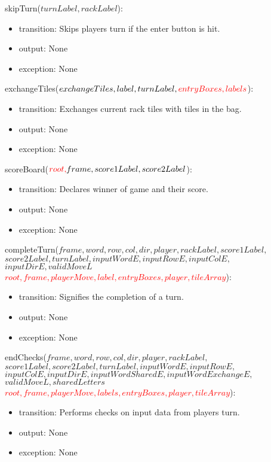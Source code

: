 \documentclass[12pt]{article}
\begin{document}
\noindent skipTurn($turnLabel, rackLabel$):
\begin{itemize}
\item transition: Skips players turn if the enter button is hit.
\item output: None
\item exception: None
\end{itemize}

\noindent exchangeTiles($exchangeTiles, label, turnLabel, \textcolor{red}{entryBoxes, labels}$):
\begin{itemize}
\item transition: Exchanges current rack tiles with tiles in the bag.
\item output: None
\item exception: None
\end{itemize}

\noindent scoreBoard($ \textcolor{red}{root,} frame, score1Label, score2Label$):
\begin{itemize}
\item transition: Declares winner of game and their score.
\item output: None
\item exception: None
\end{itemize}

\noindent completeTurn(\sout{$frame, word, row, col, dir, player, rackLabel, score1Label,$}\\ \sout{$score2Label, turnLabel, inputWordE, inputRowE, inputColE,$}\\ \sout{$inputDirE, validMoveL$} \\ \textcolor{red}{$root, frame, playerMove, label, entryBoxes, player, tileArray$}):
\begin{itemize}
\item transition: Signifies the completion of a turn.
\item output: None
\item exception: None
\end{itemize}

\noindent endChecks(\sout{$frame, word, row, col, dir, player, rackLabel,$} \\ \sout{$score1Label, score2Label, turnLabel, inputWordE, inputRowE,$} \\ \sout{$inputColE, inputDirE, inputWordSharedE, inputWordExchangeE,$} \\ \sout{$validMoveL, sharedLetters$} \\
\textcolor{red}{$root, frame, playerMove, labels, entryBoxes, player, tileArray$}):
\begin{itemize}
\item transition: Performs checks on input data from players turn.
\item output: None
\item exception: None
\end{itemize}
\end{document}
